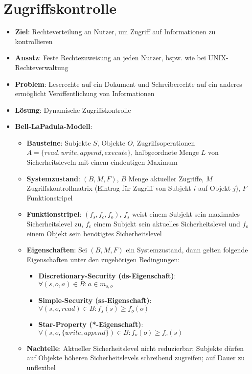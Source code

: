 \section{Zugriffskontrolle}%
\label{zugkon:sec:zugriffskontrolle}

\begin{itemize}
	\item \textbf{Ziel}: Rechteverteilung an Nutzer, um Zugriff auf Informationen zu kontrollieren
	\item \textbf{Ansatz}: Feste Rechtezuweisung an jeden Nutzer, bspw. wie bei UNIX-Rechteverwaltung
	\item \textbf{Problem}: Leserechte auf ein Dokument und Schreiberechte auf ein anderes ermöglicht Veröffentlichung von Informationen
	\item \textbf{Lösung}: Dynamische Zugriffskontrolle
	\item \textbf{Bell-LaPadula-Modell}:
	\begin{itemize}
		\item \textbf{Bausteine}: Subjekte $S$, Objekte $O$, Zugriffsoperationen $A = \{read, write, append, execute\}$, halbgeordnete Menge $L$ von Sicherheitsleveln mit einem eindeutigen Maximum
		\item \textbf{Systemzustand}: $(B, M, F)$, $B$ Menge aktueller Zugriffe, $M$ Zugriffskontrollmatrix (Eintrag für Zugriff von Subjekt $i$ auf Objekt $j$), $F$ Funktionstripel
		\item \textbf{Funktionstripel}: $(f_s, f_c, f_o)$, $f_s$ weist einem Subjekt sein maximales Sicherheitslevel zu, $f_c$ einem Subjekt sein aktuelles Sicherheitslevel und $f_o$ einem Objekt sein benötigtes Sicherheitslevel
		\item \textbf{Eigenschaften}: Sei $(B, M, F)$ ein Systemzustand, dann gelten folgende Eigenschaften unter den zugehörigen Bedingungen:
		\begin{itemize}
			\item \textbf{Discretionary-Security (ds-Eigenschaft)}: $\forall (s, o, a) \in B: a \in m_{s, o}$
			\item \textbf{Simple-Security (ss-Eigenschaft)}: $\forall (s, o, read) \in B: f_s(s) \geq f_o(o)$
			\item \textbf{Star-Property (*-Eigenschaft)}: $\forall (s, o, \{write, append\}) \in B: f_o(o) \geq f_c(s)$
		\end{itemize}
		\item \textbf{Nachteile}: Aktueller Sicherheitslevel nicht reduzierbar; Subjekte dürfen auf Objekte höheren Sicherheitslevels schreibend zugreifen; auf Dauer zu unflexibel

\end{itemize}
\end{itemize}
